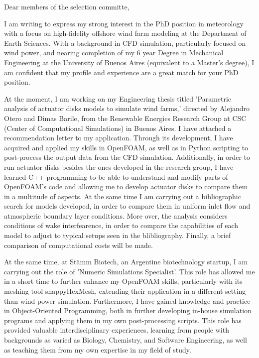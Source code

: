 \documentclass{letter}
\newcommand{\thesisname}{Parametric analysis of actuator disks models to simulate wind farms}
\begin{document}
\begin{letter}{}
\opening{Dear members of the selection committe,}

I am writing to express my strong interest in the PhD position in meteorology with a focus on high-fidelity offshore wind farm modeling at the Department of Earth Sciences.
  With a background in CFD simulation, particularly focused on wind power, and nearing completion of my 6 year Degree in Mechanical Engineering at the University of Buenos Aires (equivalent to a Master's degree), I am confident that my profile and experience are a great match for your PhD position.

At the moment, I am working on my Engineering thesis titled '\thesisname,' directed by Alejandro Otero and Dimas Barile, from the Renewable Energies Research Group at CSC (Center of Computational Simulations) in Buenos Aires. 
  I have attached a recommendation letter to my application. 
  Through its development, I have acquired and applied my skills in OpenFOAM, as well as in Python scripting to post-process the output data from the CFD simulation. 
  Additionally, in order to run actuator disks besides the ones developed in the research group, I have learned C++ programming to be able to understand and modify parts of OpenFOAM's code and allowing me to develop actuator disks to compare them in a multitude of aspects.
  At the same time I am carrying out a bibliographic search for models developed, in order to compare them in uniform inlet flow and atmospheric boundary layer conditions. 
  More over, the analysis considers conditions of wake interfearence, in order to compare the capabilities of each model to adjust to typical setups seen in the blibliography.
  Finally, a brief comparison of computational costs will be made.

At the same time, at Stämm Biotech, an Argentine biotechnology startup, I am carrying out the role of 'Numeric Simulations Specialist'. 
  This role has allowed me in a short time to further enhance my OpenFOAM skills, particularly with its meshing tool snappyHexMesh, extending their application in a different setting than wind power simulation. 
  Furthermore, I have gained knowledge and practice in Object-Oriented Programming, both in further developing in-house simulation programs and applying them in my own post-processing scripts. 
  This role has provided valuable interdisciplinary experiences, learning from people with backgrounds as varied as Biology, Chemistry, and Software Engineering, as well as teaching them from my own expertise in my field of study.


\end{letter}
\end{document}
